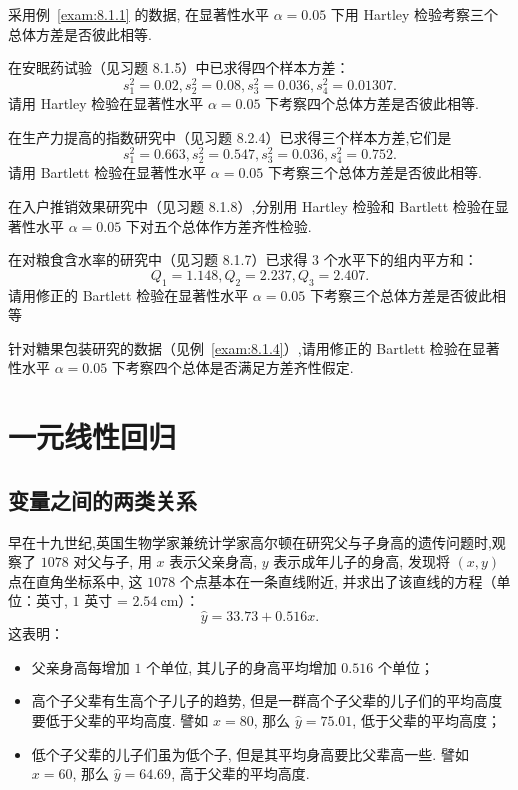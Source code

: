 \begin{xiti}
  \item 采用例~\ref{exam:8.1.1} 的数据, 在显著性水平 $\alpha = 0.05$ 下用 Hartley 检验考察三个总体方差是否彼此相等.
  \item 在安眠药试验（见习题 8.1.5）中已求得四个样本方差：
	\begin{equation}
	  s_{1}^{2} = 0.02, s_{2}^{2} = 0.08, s_{3}^{2} = 0.036, s_{4}^{2} = 0.01307.
	\end{equation}
    请用 Hartley 检验在显著性水平 $\alpha = 0.05$ 下考察四个总体方差是否彼此相等.
  \item 在生产力提高的指数研究中（见习题 8.2.4）已求得三个样本方差,它们是
	\begin{equation}
	  s_{1}^{2} = 0.663, s_{2}^{2} = 0.547, s_{3}^{2} = 0.036, s_{4}^{2} = 0.752.
	\end{equation}
    请用 Bartlett 检验在显著性水平 $\alpha = 0.05$ 下考察三个总体方差是否彼此相等.
  \item 在入户推销效果研究中（见习题 8.1.8）,分别用 Hartley 检验和 Bartlett 检验在显著性水平 $\alpha=0.05$ 下对五个总体作方差齐性检验.
  \item 在对粮食含水率的研究中（见习题 8.1.7）已求得 $3$ 个水平下的组内平方和：
  	\begin{equation}
  	  Q_{1} = 1.148, Q_{2} = 2.237, Q_{3} = 2.407.
  	\end{equation}
  	请用修正的 Bartlett 检验在显著性水平 $\alpha = 0.05$ 下考察三个总体方差是否彼此相等
  \item 针对糖果包装研究的数据（见例~\ref{exam:8.1.4}）,请用修正的 Bartlett 检验在显著性水平 $\alpha=0.05$ 下考察四个总体是否满足方差齐性假定.
\end{xiti}

\section{一元线性回归}\label{sec:8.4}

\subsection{变量之间的两类关系}\label{ssec:8.4.1}

早在十九世纪,英国生物学家兼统计学家高尔顿在研究父与子身高的遗传问题时,观察了 $1078$ 对父与子, 用 $x$ 表示父亲身高, $y$ 表示成年儿子的身高, 发现将 $(x,y)$ 点在直角坐标系中, 这 $1078$ 个点基本在一条直线附近, 并求出了该直线的方程（单位：英寸, $1$ 英寸 = $\SI{2.54}{\cm}$）：
\begin{equation*}
  \hat{y} = 33.73 + 0.516 x.
\end{equation*}
这表明：
\begin{itemize}
  \item 父亲身高每增加 $1$ 个单位, 其儿子的身高平均增加 $0.516$ 个单位；
  \item 高个子父辈有生高个子儿子的趋势, 但是一群高个子父辈的儿子们的平均高度要低于父辈的平均高度. 譬如 $x = 80$, 那么 $\hat{y}=75.01$, 低于父辈的平均高度；
  \item 低个子父辈的儿子们虽为低个子, 但是其平均身高要比父辈高一些. 譬如 $x = 60$, 那么 $\hat{y} = 64.69$, 高于父辈的平均高度.
\end{itemize}

